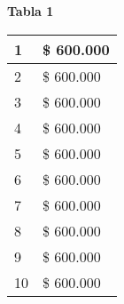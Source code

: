 \textbf{Tabla 1}\\

\begin{center}
    \begin{tabular}{|l|l|}
      \hline
      1  & \$ 600.000 \\ \hline
      2  & \$ 600.000 \\ \hline
      3  & \$ 600.000 \\ \hline
      4  & \$ 600.000 \\ \hline
      5  & \$ 600.000 \\ \hline
      6  & \$ 600.000 \\ \hline
      7  & \$ 600.000 \\ \hline
      8  & \$ 600.000 \\ \hline
      9  & \$ 600.000 \\ \hline
      10 & \$ 600.000 \\ \hline
    \end{tabular}
\end{center}